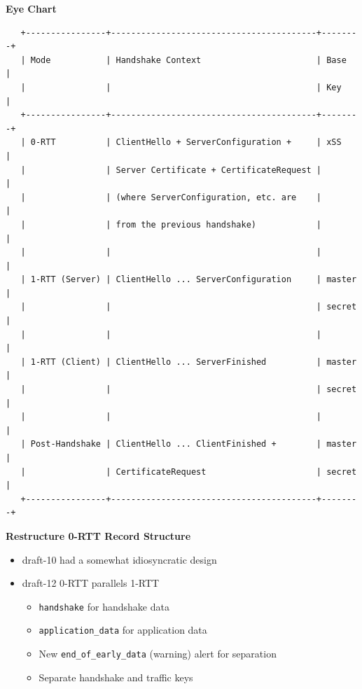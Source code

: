 \documentclass[helvetica]{seminar}
\newcommand{\heading}[1]{%
  \begin{center} 
    \large\bf 
    #1 
  \end{center} 
  \vspace{.4 in}}
\begin{document}
\begin{slide}
\heading{Eye Chart}

{\scriptsize
\begin{verbatim}
   +----------------+-----------------------------------------+--------+
   | Mode           | Handshake Context                       | Base   |
   |                |                                         | Key    |
   +----------------+-----------------------------------------+--------+
   | 0-RTT          | ClientHello + ServerConfiguration +     | xSS    |
   |                | Server Certificate + CertificateRequest |        |
   |                | (where ServerConfiguration, etc. are    |        |
   |                | from the previous handshake)            |        |
   |                |                                         |        |
   | 1-RTT (Server) | ClientHello ... ServerConfiguration     | master |
   |                |                                         | secret |
   |                |                                         |        |
   | 1-RTT (Client) | ClientHello ... ServerFinished          | master |
   |                |                                         | secret |
   |                |                                         |        |
   | Post-Handshake | ClientHello ... ClientFinished +        | master |
   |                | CertificateRequest                      | secret |
   +----------------+-----------------------------------------+--------+
\end{verbatim}
}
\end{slide}


\begin{slide}
\heading{Restructure 0-RTT Record Structure}

\begin{itemize}
\item draft-10 had a somewhat idiosyncratic design
\item draft-12 0-RTT parallels 1-RTT
  \begin{itemize}
  \item \verb^handshake^ for handshake data
  \item \verb^application_data^ for application data
  \item New \verb^end_of_early_data^ (warning) alert for separation
  \item Separate handshake and traffic keys
  \end{itemize}
\end{itemize}

\end{slide}
\end{document}
